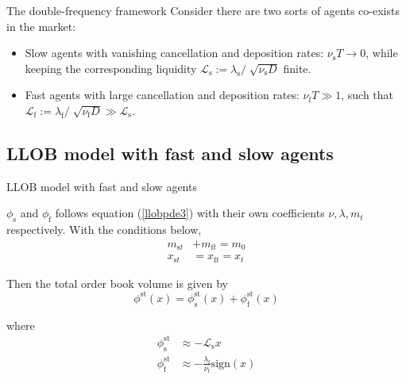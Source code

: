 \documentclass{beamer}
\begin{document}
\begin{frame}{The double-frequency framework}
Consider there are two sorts of agents co-exists in the market:

\begin{itemize}
\item Slow agents with vanishing cancellation and deposition rates: $\nu_\text{s} T \to 0$, while keeping the corresponding liquidity $\mathcal{L}_\text{s} := \lambda_\text{s}/\sqrt[]{\nu_\text{s} D}$ finite.
\item Fast agents with large cancellation and deposition rates: $\nu_\text{f} T \gg 1$, such that $\mathcal{L}_\text{f} := \lambda_\text{f} / \sqrt[]{\nu_\text{f} D} \gg \mathcal{L}_\text{s}$.
\end{itemize}

\end{frame}

\subsection{LLOB model with fast and slow agents}

\begin{frame}{LLOB model with fast and slow agents}

$\phi_\text{s}$ and $\phi_\text{f}$ follows equation (\ref{llobpde3}) with their own coefficients $\nu,\lambda,m_t$ respectively. With the conditions below,
\begin{equation}\label{doublecondition}
\begin{split}
m_{\text{s}t}&+m_{\text{f}t}=m_0 \\
x_{\text{s}t}&=x_{\text{f}t}=x_t
\end{split}
\end{equation}

Then the total order book volume is given by
\begin{equation}
\phi^\text{st}(x) = \phi_\text{s}^\text{st}(x)+\phi_\text{f}^\text{st}(x)
\end{equation}

where
\begin{equation}
\begin{split}
\phi_\text{s}^\text{st} &\approx -\mathcal{L}_\text{s}x \\
\phi_\text{f}^\text{st} &\approx -\frac{\lambda_\text{f}}{\nu_\text{f}}\text{sign}(x)
\end{split}
\end{equation}

\end{frame}
\end{document}
